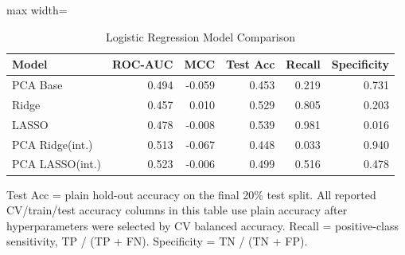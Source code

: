 \begin{table}[htbp]
\centering
\caption{Logistic Regression Model Comparison}
\label{tab:logistic_regression_comparison}
\begin{adjustbox}{max width=\linewidth}
\begin{tabular}{lrrrrr}
\toprule
Model & ROC-AUC & MCC & Test Acc & Recall & Specificity \\
\midrule
PCA Base & 0.494 & -0.059 & 0.453 & 0.219 & 0.731 \\
Ridge & 0.457 & 0.010 & 0.529 & 0.805 & 0.203 \\
LASSO & 0.478 & -0.008 & 0.539 & 0.981 & 0.016 \\
PCA Ridge(int.) & 0.513 & -0.067 & 0.448 & 0.033 & 0.940 \\
PCA LASSO(int.) & 0.523 & -0.006 & 0.499 & 0.516 & 0.478 \\
\bottomrule
\end{tabular}
\end{adjustbox}
\par\smallskip
\footnotesize Test Acc = plain hold-out accuracy on the final 20\% test split. All reported CV/train/test accuracy columns in this table use plain accuracy after hyperparameters were selected by CV balanced accuracy. Recall = positive-class sensitivity, TP / (TP + FN). Specificity = TN / (TN + FP).
\end{table}
